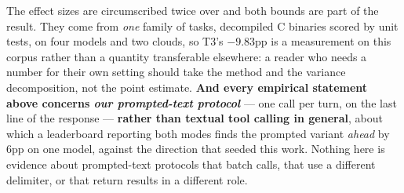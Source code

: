 The effect sizes are circumscribed twice over and both bounds are part of the result. They come from
\emph{one} family of tasks, decompiled C binaries scored by unit tests, on four models and two clouds,
so T3's $-9.83$pp is a measurement on this corpus rather than a quantity transferable elsewhere: a reader
who needs a number for their own setting should take the method and the variance decomposition, not the
point estimate. \textbf{And every empirical statement above concerns \emph{our prompted-text protocol}} ---
one call per turn, on the last line of the response --- \textbf{rather than textual tool calling in
general}, about which a leaderboard reporting both modes finds the prompted variant \emph{ahead} by 6pp on
one model, against the direction that seeded this work. Nothing here is evidence about prompted-text
protocols that batch calls, that use a different delimiter, or that return results in a different role.
